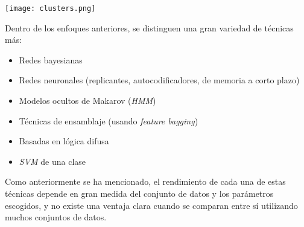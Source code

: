 \begin{itemize}[topsep=0pt]
		\begin{minipage}{\linewidth}
			\centering
			\texttt{[image: clusters.png]}
			\label{fig:fig5}
		\end{minipage}
\end{itemize}

Dentro de los enfoques anteriores, se distinguen una gran variedad de técnicas más:
\begin{itemize}[noitemsep,topsep=0pt]
	\item Redes bayesianas
	\item Redes neuronales (replicantes, autocodificadores, de memoria a corto plazo)
	\item Modelos ocultos de Makarov (\textit{HMM})
	\item Técnicas de ensamblaje (usando \textit{feature bagging})
	\item Basadas en lógica difusa
	\item \textit{SVM} de una clase
\end{itemize}

Como anteriormente se ha mencionado, el rendimiento de cada una de estas técnicas depende
en gran medida del conjunto de datos y los parámetros escogidos, y no existe una ventaja
clara cuando se comparan entre sí utilizando muchos conjuntos de datos.~\cite{chandola2009anomaly}
